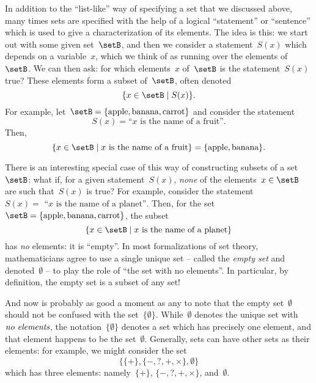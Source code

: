 {In addition to the ``list-like'' way of specifying a set that we discussed above, many times sets are specified with the help of a logical ``statement'' or ``sentence'' which is used to give a characterization of its elements.
The idea is this: we start out with some given set~$\setB$, and then we consider a statement~$S(x)$ which depends on a variable~$x$, which we think of as running over the elements of~$\setB$.
We can then ask: for which elements~$x$ of~$\setB$ is the statement~$S(x)$ true? These elements form a subset of~$\setB$, often denoted
\begin{equation}
\{ x \in \setB \mid S(x) \}.
\end{equation}
For example, let~$\setB = \{ \text{apple}, \text{banana}, \text{carrot} \}$ and consider the statement
\begin{equation}
S(x) = \text{``} x \text{ is the name of a fruit''}.
\end{equation}
Then, 
\begin{equation}
\{ x \in \setB \mid x \text{ is the name of a fruit} \} = \{ \text{apple}, \text{banana} \}.
\end{equation}

There is an interesting special case of this way of constructing subsets of a set~$\setB$:
what if, for a given statement~$S(x)$, \emph{none} of the elements~$x \in \setB$ are such that~$S(x)$ is true?
For example, consider the statement~$S(x) =\text{ ``} x \text{ is the name of a planet''}$.
Then, for the set~$\setB = \{ \text{apple}, \text{banana}, \text{carrot} \}$, the subset
\begin{equation}
\{ x \in \setB \mid x \text{ is the name of a planet} \}
\end{equation}
has \emph{no} elements: it is ``empty''.
In most formalizations of set theory, mathematicians agree to use a single unique set -- called the \emph{empty set} and denoted~$\emptyset$ -- to play the role of ``the set with no elements''.
In particular, by definition, the empty set is a subset of any set!

And now is probably as good a moment as any to note that the empty set~$\emptyset$ should not be confused with the set~$\{ \emptyset \}$.
While~$\emptyset$ denotes the unique set with~$\emph{no elements}$, the notation~$\{ \emptyset \}$ denotes a set which has precisely one element, and that element happens to be the set~$\emptyset$.
Generally, sets can have other sets as their elements: for example, we might consider the set
\begin{equation}
\{ \{ + \}, \{ -, ?, +, \times \}, \emptyset \}
\end{equation}
which has three elements: namely~$\{ + \}$, $\{ -, ?, +, \times \}$,  and~$\emptyset$.


}
